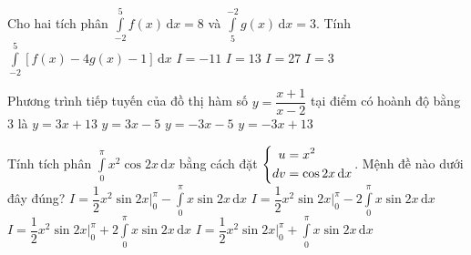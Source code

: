 \begin{ex}%
Cho hai tích phân $\displaystyle \int \limits _{-2}^5 f(x) \mathrm{\,d}x =8$ và $\displaystyle \int \limits _{5}^{-2} g(x) \mathrm{\,d}x =3$. Tính $\displaystyle \int \limits _{-2}^5\left[ f(x)-4g(x)-1 \right] \mathrm{\,d}x$
\choice
{$I=-11$}
{\True $I=13$}
{$I=27$}
{$I=3$}
\end{ex}
\begin{ex}%
Phương trình tiếp tuyến của đồ thị hàm số $y=\dfrac{x+1}{x-2}$ tại điểm có hoành độ bằng $3$ là
\choice
{$y=3x+13$}
{$y=3x-5$}
{$y=-3x-5$}
{\True $y=-3x+13$}
\end{ex}
\begin{ex}%
Tính tích phân $\displaystyle \int \limits _{0}^{\pi} x^2 \cos 2x \mathrm{\,d}x $ bằng cách đặt $\left\{\begin{aligned}u&=x^2\\ dv &= \cos 2x \mathrm{\,d}x\end{aligned}\right.$. Mệnh đề nào dưới đây đúng?
\choice
{\True $\displaystyle I= \dfrac{1}{2} x^2 \sin 2x \bigg|_0 ^ {\pi} - \displaystyle \int \limits _{0}^{\pi} x \sin 2x \mathrm{\,d}x$}
{$\displaystyle I= \dfrac{1}{2} x^2 \sin 2x \bigg|_0 ^ {\pi} - \displaystyle 2 \int \limits _{0}^{\pi} x \sin 2x \mathrm{\,d}x$}
{$\displaystyle I= \dfrac{1}{2} x^2 \sin 2x \bigg|_0 ^ {\pi} + \displaystyle 2 \int \limits _{0}^{\pi} x \sin 2x \mathrm{\,d}x$}
{$\displaystyle I= \dfrac{1}{2} x^2 \sin 2x \bigg|_0 ^ {\pi} + \displaystyle \int \limits _{0}^{\pi} x \sin 2x \mathrm{\,d}x$}
\end{ex}
